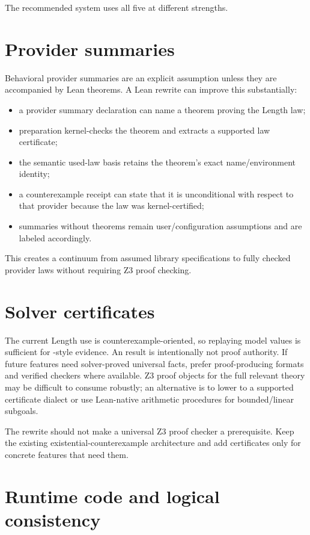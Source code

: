 \documentclass[10pt,letterpaper,oneside]{report}
\newcommand{\code}[1]{\texttt{\detokenize{#1}}}
\begin{document}
The recommended system uses all five at different strengths.

\section{Provider summaries}

Behavioral provider summaries are an explicit assumption unless they are accompanied by Lean theorems. A Lean rewrite can improve this substantially:

\begin{itemize}
  \item a provider summary declaration can name a theorem proving the Length law;
  \item preparation kernel-checks the theorem and extracts a supported law certificate;
  \item the semantic used-law basis retains the theorem's exact name/environment identity;
  \item a counterexample receipt can state that it is unconditional with respect to that provider because the law was kernel-certified;
  \item summaries without theorems remain user/configuration assumptions and are labeled accordingly.
\end{itemize}

This creates a continuum from assumed library specifications to fully checked provider laws without requiring Z3 proof checking.

\section{Solver certificates}

The current Length use is counterexample-oriented, so replaying model values is sufficient for \code{sat}-style evidence. An \code{unsat} result is intentionally not proof authority. If future features need solver-proved universal facts, prefer proof-producing formats and verified checkers where available. Z3 proof objects for the full relevant theory may be difficult to consume robustly; an alternative is to lower to a supported certificate dialect or use Lean-native arithmetic procedures for bounded/linear subgoals.

The rewrite should not make a universal Z3 proof checker a prerequisite. Keep the existing existential-counterexample architecture and add certificates only for concrete features that need them.

\section{Runtime code and logical consistency}
\end{document}
